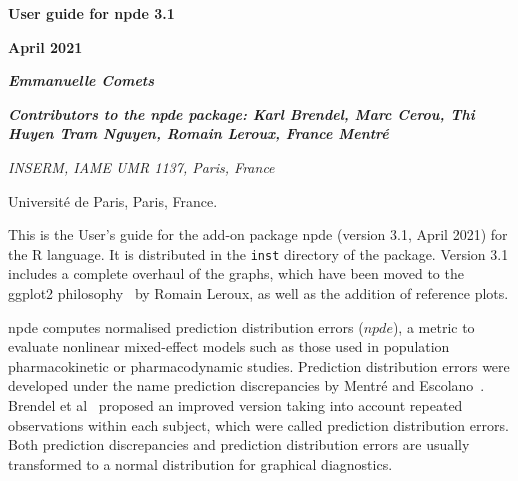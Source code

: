 \documentclass[12pt,a4paper]{article}
\begin{document}

\pagestyle{fancy}
\renewcommand{\headrulewidth}{0pt}
\renewcommand{\footrulewidth}{1pt}
\lhead{}
\chead{}
\rhead{}
\rfoot{\thepage}

\newcommand{\D}{\displaystyle} \normalsize
\renewcommand{\thetable}{\Roman{Contents}}
\renewcommand{\refname}{References}
\renewcommand{\listfigurename}{{\bfseries \sc Legends for figures}}
\renewcommand{\labelitemi}{$\bullet$}

\parindent 18pt
$\phantom{minime}$

\vskip 3cm
\begin{center}
{\setlength{\baselineskip}{2\baselineskip}
{\Large \bfseries User guide for npde 3.1}

{\Large \bfseries April 2021}

\bigskip 

{\Large \itshape \bfseries Emmanuelle Comets}

{\large \itshape \bfseries Contributors to the npde package: Karl Brendel, Marc Cerou, Thi Huyen Tram Nguyen,  Romain Leroux, France Mentr\'e}

\bigskip
{\it
INSERM, IAME UMR 1137, Paris, France

Universit\'e de Paris, Paris, France.
}
\par}
\end{center}

\vskip 8cm %

\newpage
\tableofcontents
\newpage

\hskip 18pt  This is the User's guide for the add-on package {\sf npde} (version 3.1, April 2021) for the {\sf R} language. It is distributed in the \texttt{inst} directory of the package. Version 3.1 includes a complete overhaul of the graphs, which have been moved to the {\sf ggplot2} philosophy~\cite{ggplot2} by Romain Leroux, as well as the addition of reference plots.

{\sf npde} computes normalised prediction distribution errors ($npde$), a metric to evaluate nonlinear mixed-effect models such as those used in population pharmacokinetic or pharmacodynamic studies. Prediction distribution errors were developed under the name prediction discrepancies by Mentr\'e and Escolano~\cite{MentrePDE}. Brendel et al~\cite{Brendel06} proposed an improved version taking into account repeated observations within each subject, which were called prediction distribution errors. Both prediction discrepancies and prediction distribution errors are usually transformed to a normal distribution for graphical diagnostics.
\end{document}

